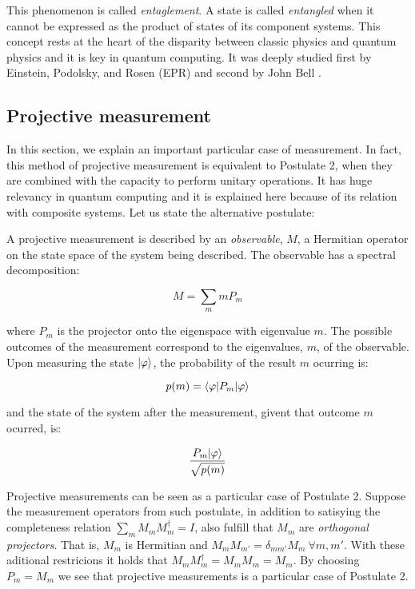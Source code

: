 This phenomenon is called \emph{entaglement}. A state is called \emph{entangled} when it cannot be expressed as the product of states of its component systems. This concept rests at the heart of the disparity between classic physics and quantum physics and it is key in quantum computing. It was deeply studied first by Einstein, Podolsky, and Rosen (EPR) \cite{Einstein1935} and second by John Bell \cite{Bellt1964}.


\subsection{Projective measurement}
\label{projective-measurement}


In this section, we explain an important particular case of measurement. In fact, this method of projective measurement is equivalent to Postulate 2, when they are combined with the capacity to perform unitary operations. It has huge relevancy in quantum computing and it is explained here because of its relation with composite systems. Let us state the alternative postulate:

\begin{postulate 2'}
	A projective measurement is described by an \emph{observable}, $M$, a Hermitian operator on the state space of the system being described. The observable has a spectral decomposition:
	
	$$ M = \sum_m m P_m$$
	
	where $P_m$ is the projector onto the eigenspace with eigenvalue $m$. The possible outcomes of the measurement correspond to the eigenvalues, $m$, of the observable. Upon measuring the state $|\varphi\rangle$, the probability of the result $m$ ocurring is:
		
	$$ p(m) = \langle \varphi | P_m | \varphi \rangle $$
	
	and the state of the system after the measurement, givent that outcome $m$ ocurred, is:
	
	$$ \frac{P_m |\varphi\rangle}{\sqrt{p(m)}} $$
\end{postulate 2'}

Projective measurements can be seen as a particular case of Postulate 2. Suppose the measurement operators from such postulate, in addition to satisying the completeness relation $\sum_m M_m M_m^\dagger = I$, also fulfill that $M_m$ are \emph{orthogonal projectors}. That is, $M_m$ is Hermitian and $M_m M_{m'} = \delta_{mm'} M_m \ \forall m,m'$. With these aditional restricions it holds that $M_m M_m^\dagger = M_m M_m = M_m$. By choosing $P_m = M_m$ we see that projective measurements is a particular case of Postulate 2.

